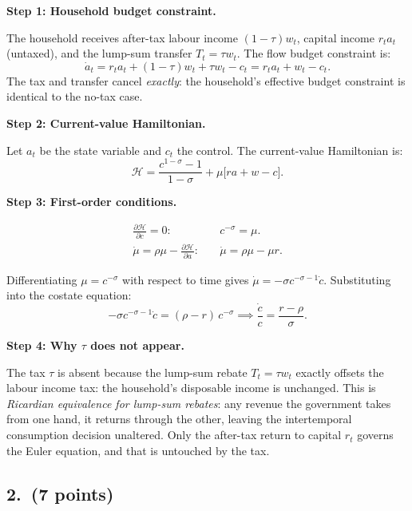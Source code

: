 \documentclass[a4paper,11pt]{article}
\begin{document}
\begin{answerbox}
\textbf{Step 1: Household budget constraint.}

The household receives after-tax labour income $(1-\tau)w_t$, capital income $r_t a_t$
(untaxed), and the lump-sum transfer $T_t = \tau w_t$. The flow budget constraint is:
\[
    \dot{a}_t = r_t a_t + (1-\tau)w_t + \tau w_t - c_t
    = r_t a_t + w_t - c_t.
\]
The tax and transfer cancel \emph{exactly}: the household's effective budget constraint is
identical to the no-tax case.

\textbf{Step 2: Current-value Hamiltonian.}

Let $a_t$ be the state variable and $c_t$ the control. The current-value Hamiltonian is:
\[
    \mathcal{H} = \frac{c^{1-\sigma}-1}{1-\sigma} + \mu\bigl[r a + w - c\bigr].
\]

\textbf{Step 3: First-order conditions.}

\begin{align*}
    \frac{\partial\mathcal{H}}{\partial c} = 0: &\quad c^{-\sigma} = \mu. \\
    \dot{\mu} = \rho\mu - \frac{\partial\mathcal{H}}{\partial a}: &\quad
    \dot{\mu} = \rho\mu - \mu r.
\end{align*}

Differentiating $\mu = c^{-\sigma}$ with respect to time gives
$\dot{\mu} = -\sigma c^{-\sigma-1}\dot{c}$.  Substituting into the costate equation:
\[
    -\sigma c^{-\sigma-1}\dot{c} = (\rho - r)\,c^{-\sigma}
    \implies
    \boxed{\frac{\dot{c}}{c} = \frac{r - \rho}{\sigma}.}
\]

\textbf{Step 4: Why $\tau$ does not appear.}

The tax $\tau$ is absent because the lump-sum rebate $T_t = \tau w_t$ exactly offsets the
labour income tax: the household's disposable income is unchanged. This is
\emph{Ricardian equivalence for lump-sum rebates}: any revenue the government takes from
one hand, it returns through the other, leaving the intertemporal consumption decision
unaltered. Only the after-tax return to capital $r_t$ governs the Euler equation, and
that is untouched by the tax.
\end{answerbox}

\subsection*{2.\ (7 points)}
\end{document}
